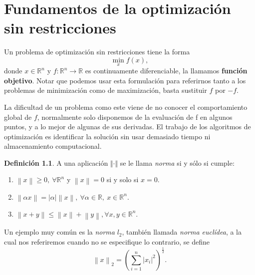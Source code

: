 \documentclass[11pt,a4paper]{book}
\theoremstyle{definition}
\newtheorem{definition}[theorem]{Definición}
\theoremstyle{remark}
\newcommand{\norm}[1]{\left\lVert#1\right\rVert}
\begin{document}
\chapter{Fundamentos de la optimización sin restricciones}

Un problema de optimización sin restricciones tiene la forma 
\begin{equation}
	\min_{x}f\left(x\right),
	\label{eq:minf}
\end{equation}
donde $x\in\mathbb{R}^{n}$ y $f : \mathbb{R}^{n} \rightarrow \mathbb{R}$ es continuamente diferenciable, la llamamos \textbf{función objetivo}. 
Notar que podemos usar esta formulación para referirnos tanto a los problemas de minimización como de maximización, basta sustituir $f$ por $-f$. 

La dificultad de un problema como este viene de no conocer el comportamiento global de $f$, normalmente solo disponemos de la evaluación de f en algunos puntos, y a lo mejor de algunas de sus derivadas. El trabajo de los algoritmos de optimización es identificar la solución sin usar demasiado tiempo ni almacenamiento computacional.

\begin{definition}
	A una aplicación $\Vert \cdot \Vert$ se le llama \textit{norma} si y sólo si cumple:
	\vspace{-0.4cm}
	\begin{enumerate}
		\item $\norm{x} \geq 0, \: \forall \mathbb{R}^n$ y $\norm{x}=0$ si y solo si $x=0$.
		\item $\norm{\alpha x} = \vert \alpha \vert \norm{x},\: \forall \alpha \in \mathbb{R},\: x\in \mathbb{R}^n.$
		\item $\norm{x+y} \leq \norm{x} + \norm{y}, \forall x,y \in \mathbb{R}^n$.
	\end{enumerate}
\end{definition}

Un ejemplo muy común es la
\textit{norma} $l_2$, también llamada \textit{norma euclídea}, a la cual nos referiremos cuando no se especifique lo contrario, se define
\begin{equation}
		\norm{x}_2 = \left( \sum_{i=1}^n \vert x_i \vert^2 \right)^{\frac{1}{2}}.
\end{equation}
\end{document}
